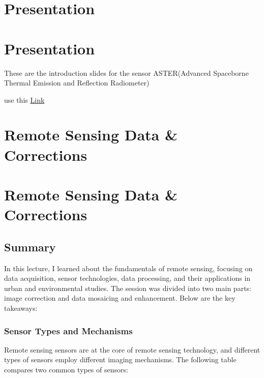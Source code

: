 \documentclass[
  letterpaper,
  DIV=11,
  numbers=noendperiod]{scrreprt}
\begin{document}

\chapter{Presentation}\label{presentation}


\chapter{Presentation}\label{presentation-1}

These are the introduction slides for the sensor ASTER(Advanced
Spaceborne Thermal Emission and Reflection Radiometer)

use this
\href{https://lydia0930.github.io/CASA0023xaringan/w2-slides.html}{Link}


\chapter{Remote Sensing Data \&
Corrections}\label{remote-sensing-data-corrections}


\chapter{Remote Sensing Data \&
Corrections}\label{remote-sensing-data-corrections-1}

\section{Summary}\label{summary}

In this lecture, I learned about the fundamentals of remote sensing,
focusing on data acquisition, sensor technologies, data processing, and
their applications in urban and environmental studies. The session was
divided into two main parts: image correction and data mosaicing and
enhancement. Below are the key takeaways:

\subsection{Sensor Types and
Mechanisms}\label{sensor-types-and-mechanisms}

Remote sensing sensors are at the core of remote sensing technology, and
different types of sensors employ different imaging mechanisms. The
following table compares two common types of sensors:
\end{document}

